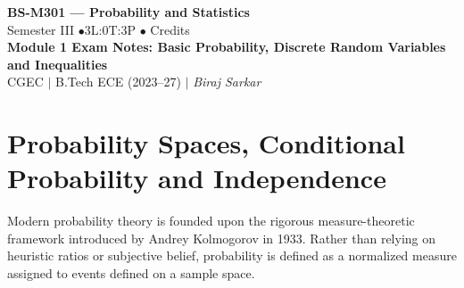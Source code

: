 \documentclass[12pt,a4paper]{article}
\begin{document}
\begin{center}
  {\LARGE\bfseries\color{myred} BS-M301 --- Probability and Statistics}\\[5pt]
  {\normalsize\color{mydark} Semester III \quad$\bullet$\quad 3L:0T:3P \quad$\bullet$ Credits}\\[3pt]
  {\normalsize\color{myteal}\textbf{Module 1 Exam Notes: Basic Probability, Discrete Random Variables and Inequalities}}\\[3pt]
  {\small\color{mydark} CGEC \;$|$\; B.Tech ECE (2023--27) \;$|$\; \textit{Biraj Sarkar}}
\end{center}
\vspace{2pt}
\noindent{\color{myred}\rule{\linewidth}{1.5pt}}
\vspace{2pt}

\hypersetup{linkcolor=mydark}
\tableofcontents
\hypersetup{linkcolor=myteal}
\newpage

\section{Probability Spaces, Conditional Probability and Independence}

Modern probability theory is founded upon the rigorous measure-theoretic framework introduced by Andrey Kolmogorov in 1933. Rather than relying on heuristic ratios or subjective belief, probability is defined as a normalized measure assigned to events defined on a sample space.
\end{document}
